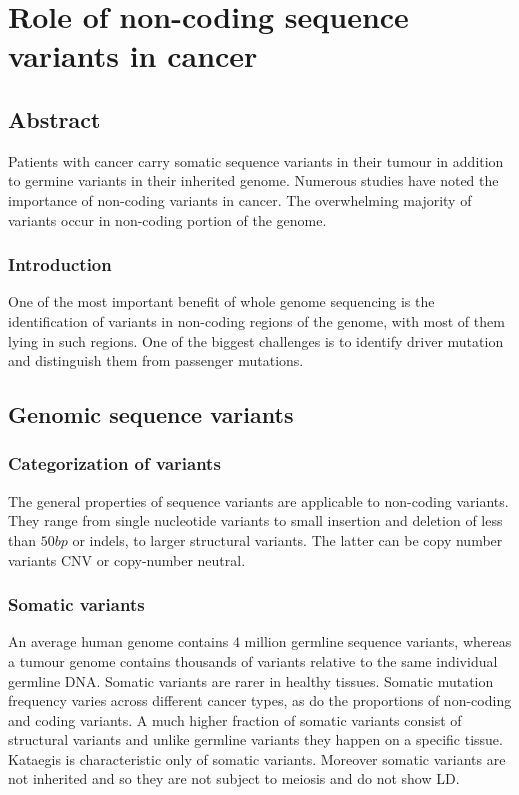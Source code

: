 \graphicspath{{chapters/papers/01/images}}
\chapter{Role of non-coding sequence variants in cancer}

\section{Abstract}
Patients with cancer carry somatic sequence variants in their tumour in addition to germine variants in their inherited genome.
Numerous studies have noted the importance of non-coding variants in cancer.
The overwhelming majority of variants occur in non-coding portion of the genome.

	\subsection{Introduction}
	One of the most important benefit of whole genome sequencing is the identification of variants in non-coding regions of the genome, with most of them lying in such regions.
	One of the biggest challenges is to identify driver mutation and distinguish them from passenger mutations.

\section{Genomic sequence variants}

	\subsection{Categorization of variants}
	The general properties of sequence variants are applicable to non-coding variants.
	They range from single nucleotide variants to small insertion and deletion of less than $50bp$ or indels, to larger structural variants.
	The latter can be copy number variants CNV or copy-number neutral.

	\subsection{Somatic variants}
	An average human genome contains $4$ million germline sequence variants, whereas a tumour genome contains thousands of variants relative to the same individual germline DNA.
	Somatic variants are rarer in healthy tissues.
	Somatic mutation frequency varies across different cancer types, as do the proportions of non-coding and coding variants.
	A much higher fraction of somatic variants consist of structural variants and unlike germline variants they happen on a specific tissue.
	Kataegis is characteristic only of somatic variants.
	Moreover somatic variants are not inherited and so they are not subject to meiosis and do not show LD.

